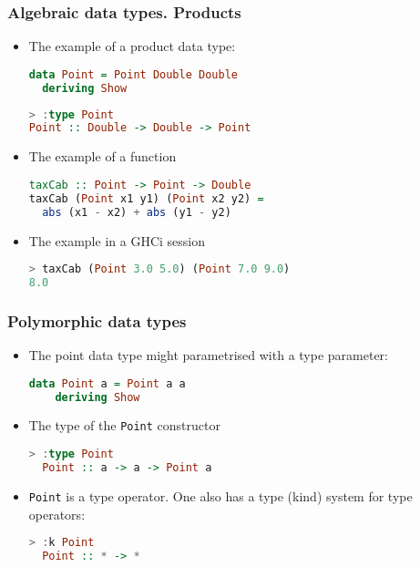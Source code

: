 \documentclass[10pt,pdf,utf8,russian,aspectratio=169]{beamer}
\begin{document}
\begin{frame}[fragile]
\frametitle{Algebraic data types. Products}

\begin{itemize}
\item The example of a product data type:

\begin{lstlisting}[language=Haskell]
data Point = Point Double Double
  deriving Show
\end{lstlisting}

\begin{lstlisting}[language=Haskell]
> :type Point
Point :: Double -> Double -> Point
\end{lstlisting}
\item The example of a function

\begin{lstlisting}[language=Haskell]
taxCab :: Point -> Point -> Double
taxCab (Point x1 y1) (Point x2 y2) =
  abs (x1 - x2) + abs (y1 - y2)
\end{lstlisting}

\item The example in a GHCi session
\begin{lstlisting}[language=Haskell]
> taxCab (Point 3.0 5.0) (Point 7.0 9.0)
8.0
\end{lstlisting}

\end{itemize}
\end{frame}

\begin{frame}[fragile]
  \frametitle{Polymorphic data types}

\begin{itemize}
  \item The point data type might parametrised with a type parameter:
  \begin{lstlisting}[language=Haskell]
  data Point a = Point a a
    deriving Show
  \end{lstlisting}

  \item The type of the \verb"Point" constructor
  \begin{lstlisting}[language=Haskell]
  > :type Point
  Point :: a -> a -> Point a
  \end{lstlisting}
  \item \verb"Point" is a type operator. One also has a type (kind) system for type operators:
  \begin{lstlisting}[language=Haskell]
  > :k Point
  Point :: * -> *
  \end{lstlisting}
\end{itemize}
\end{frame}
\end{document}
